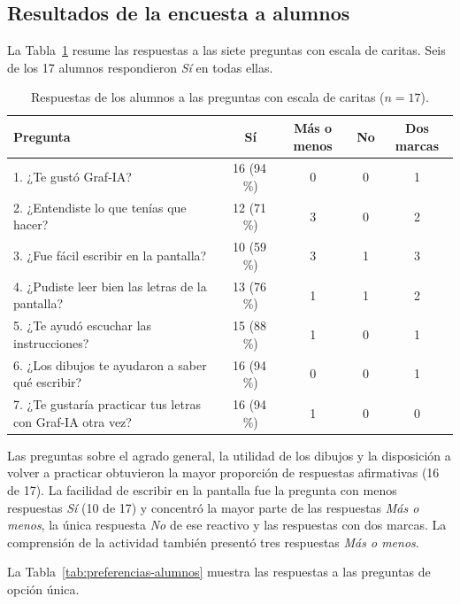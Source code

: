 \subsection{Resultados de la encuesta a alumnos}
\label{sec:resultados-alumnos}

La Tabla~\ref{tab:resultados-alumnos} resume las respuestas a las siete preguntas con escala de caritas. Seis de los 17 alumnos respondieron \textit{Sí} en todas ellas.

\begin{table}[H]
\centering
\caption{Respuestas de los alumnos a las preguntas con escala de caritas ($n=17$).}
\label{tab:resultados-alumnos}
\renewcommand{\arraystretch}{1.3}
\begin{tabular}{|p{6.4cm}|c|c|c|c|}
\hline
\textbf{Pregunta} & \textbf{Sí} & \textbf{Más o menos} & \textbf{No} & \textbf{Dos marcas} \\ \hline
1. ¿Te gustó Graf-IA? & 16 (94\,\%) & 0 & 0 & 1 \\ \hline
2. ¿Entendiste lo que tenías que hacer? & 12 (71\,\%) & 3 & 0 & 2 \\ \hline
3. ¿Fue fácil escribir en la pantalla? & 10 (59\,\%) & 3 & 1 & 3 \\ \hline
4. ¿Pudiste leer bien las letras de la pantalla? & 13 (76\,\%) & 1 & 1 & 2 \\ \hline
5. ¿Te ayudó escuchar las instrucciones? & 15 (88\,\%) & 1 & 0 & 1 \\ \hline
6. ¿Los dibujos te ayudaron a saber qué escribir? & 16 (94\,\%) & 0 & 0 & 1 \\ \hline
7. ¿Te gustaría practicar tus letras con Graf-IA otra vez? & 16 (94\,\%) & 1 & 0 & 0 \\ \hline
\end{tabular}
\end{table}

Las preguntas sobre el agrado general, la utilidad de los dibujos y la disposición a volver a practicar obtuvieron la mayor proporción de respuestas afirmativas (16 de 17). La facilidad de escribir en la pantalla fue la pregunta con menos respuestas \textit{Sí} (10 de 17) y concentró la mayor parte de las respuestas \textit{Más o menos}, la única respuesta \textit{No} de ese reactivo y las respuestas con dos marcas. La comprensión de la actividad también presentó tres respuestas \textit{Más o menos}.

La Tabla~\ref{tab:preferencias-alumnos} muestra las respuestas a las preguntas de opción única.

